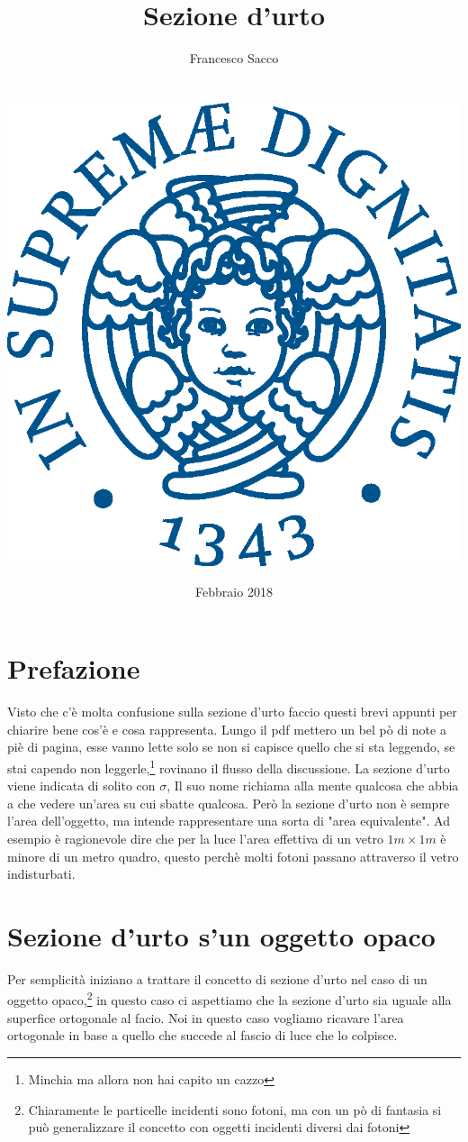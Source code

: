 \documentclass[11pt,a4paper]{article}
\date{{\LARGE Febbraio 2018}}
\title{{\myfont Sezione d'urto}}
\author{{\Huge Francesco Sacco}\\ \\ \\
		\includegraphics[scale=0.6]{Immagini/cherubino.eps}\\}
\begin{document}
	\maketitle
	\newpage
	\section*{Prefazione}
		Visto che c'è molta confusione sulla sezione d'urto faccio questi brevi appunti per chiarire bene cos'è e cosa rappresenta.\newline
		Lungo il pdf mettero un bel pò di note a piè di pagina, esse vanno lette solo se non si capisce quello che si sta leggendo, se stai capendo non leggerle,\footnote{Minchia ma allora non hai capito un cazzo} rovinano il flusso della discussione.\newline 
		La sezione d'urto viene indicata di solito con $\sigma$, Il suo nome richiama alla mente qualcosa che abbia a che vedere un'area su cui sbatte qualcosa. Però la sezione d'urto non è sempre l'area dell'oggetto, ma intende rappresentare una sorta di "area equivalente".\newline
		Ad esempio è ragionevole dire che per la luce l'area effettiva di un vetro $1m\times 1m$ è minore di un metro quadro, questo perchè molti fotoni passano attraverso il vetro indisturbati.\newline
	\section{Sezione d'urto s'un oggetto opaco}
	\label{sec:opaco}
		Per semplicità iniziano a trattare il concetto di sezione d'urto nel caso di un oggetto opaco,\footnote{Chiaramente le particelle incidenti sono fotoni, ma con un pò di fantasia si può generalizzare il concetto con oggetti incidenti diversi dai fotoni} in questo caso ci aspettiamo che la sezione d'urto sia uguale alla superfice ortogonale al facio.\newline
		Noi in questo caso vogliamo ricavare l'area ortogonale in base a quello che succede al fascio di luce che lo colpisce.\newline
\end{document}
